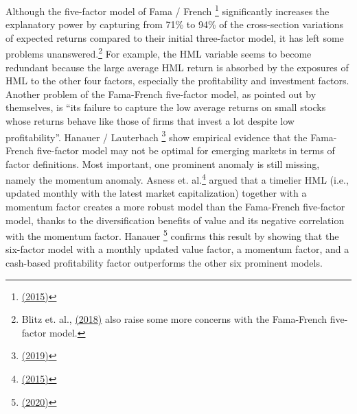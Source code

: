 \documentclass[a4paper,12pt]{article}
\begin{document}
Although the five-factor model of Fama / French \footnote{\protect\hyperlink{ref-RN17}{(2015)}} significantly increases the explanatory power by capturing from 71\% to 94\% of the cross-section variations of expected returns compared to their initial three-factor model, it has left some problems unanswered.\footnote{Blitz et. al., \protect\hyperlink{ref-RN69}{(2018)} also raise some more concerns with the Fama-French five-factor model.} For example, the HML variable seems to become redundant because the large average HML return is absorbed by the exposures of HML to the other four factors, especially the profitability and investment factors. Another problem of the Fama-French five-factor model, as pointed out by themselves, is ``its failure to capture the low average returns on small stocks whose returns behave like those of firms that invest a lot despite low profitability''. Hanauer / Lauterbach \footnote{\protect\hyperlink{ref-RN19}{(2019)}} show empirical evidence that the Fama-French five-factor model may not be optimal for emerging markets in terms of factor definitions. Most important, one prominent anomaly is still missing, namely the momentum anomaly. Asness et. al.\footnote{\protect\hyperlink{ref-RN71}{(2015)}} argued that a timelier HML (i.e., updated monthly with the latest market capitalization) together with a momentum factor creates a more robust model than the Fama-French five-factor model, thanks to the diversification benefits of value and its negative correlation with the momentum factor. Hanauer \footnote{\protect\hyperlink{ref-RN65}{(2020)}} confirms this result by showing that the six-factor model with a monthly updated value factor, a momentum factor, and a cash-based profitability factor outperforms the other six prominent models.
\end{document}
